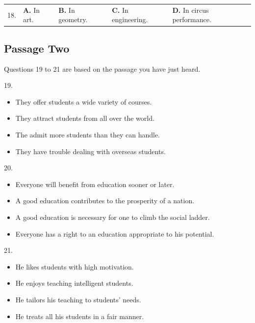 \documentclass[UTF8,11pt]{ctexart}
\begin{document}
\noindent\begin{tabularx}{\linewidth}{@{}lXXXX@{}}18. & \textbf{A.} In art. & \textbf{B.} In geometry. & \textbf{C.} In engineering. & \textbf{D.} In circus performance.\\\end{tabularx}\par

\subsection*{Passage Two}


Questions 19 to 21 are based on the passage you have just heard.


19.


\begin{itemize}[leftmargin=2em,itemsep=.2em,topsep=.4em]\item[A.] They offer students a wide variety of courses.
\item[B.] They attract students from all over the world.
\item[C.] The admit more students than they can handle.
\item[D.] They have trouble dealing with overseas students.
\end{itemize}

20.


\begin{itemize}[leftmargin=2em,itemsep=.2em,topsep=.4em]\item[A.] Everyone will benefit from education sooner or later.
\item[B.] A good education contributes to the prosperity of a nation.
\item[C.] A good education is necessary for one to climb the social ladder.
\item[D.] Everyone has a right to an education appropriate to his potential.
\end{itemize}

21.


\begin{itemize}[leftmargin=2em,itemsep=.2em,topsep=.4em]\item[A.] He likes students with high motivation.
\item[B.] He enjoys teaching intelligent students.
\item[C.] He tailors his teaching to students’ needs.
\item[D.] He treats all his students in a fair manner.
\end{itemize}
\end{document}
